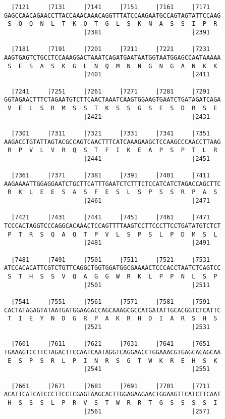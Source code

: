 \documentclass{article}
\begin{document}
\begin{Verbatim}
  |7121     |7131     |7141     |7151     |7161     |7171   
GAGCCAACAGAACCTTACCAAACAAACAGGTTTATCCAAGAATGCCAGTAGTATTCCAAG
 S  Q  Q  N  L  T  K  Q  T  G  L  S  K  N  A  S  S  I  P  R 
                      |2381                         |2391   
  
  |7181     |7191     |7201     |7211     |7221     |7231   
AAGTGAGTCTGCCTCCAAAGGACTAAATCAGATGAATAATGGTAATGGAGCCAATAAAAA
 S  E  S  A  S  K  G  L  N  Q  M  N  N  G  N  G  A  N  K  K 
                      |2401                         |2411   
  
  |7241     |7251     |7261     |7271     |7281     |7291   
GGTAGAACTTTCTAGAATGTCTTCAACTAAATCAAGTGGAAGTGAATCTGATAGATCAGA
 V  E  L  S  R  M  S  S  T  K  S  S  G  S  E  S  D  R  S  E 
                      |2421                         |2431   
  
  |7301     |7311     |7321     |7331     |7341     |7351   
AAGACCTGTATTAGTACGCCAGTCAACTTTCATCAAAGAAGCTCCAAGCCCAACCTTAAG
 R  P  V  L  V  R  Q  S  T  F  I  K  E  A  P  S  P  T  L  R 
                      |2441                         |2451   
  
  |7361     |7371     |7381     |7391     |7401     |7411   
AAGAAAATTGGAGGAATCTGCTTCATTTGAATCTCTTTCTCCATCATCTAGACCAGCTTC
 R  K  L  E  E  S  A  S  F  E  S  L  S  P  S  S  R  P  A  S 
                      |2461                         |2471   
  
  |7421     |7431     |7441     |7451     |7461     |7471   
TCCCACTAGGTCCCAGGCACAAACTCCAGTTTTAAGTCCTTCCCTTCCTGATATGTCTCT
 P  T  R  S  Q  A  Q  T  P  V  L  S  P  S  L  P  D  M  S  L 
                      |2481                         |2491   
  
  |7481     |7491     |7501     |7511     |7521     |7531   
ATCCACACATTCGTCTGTTCAGGCTGGTGGATGGCGAAAACTCCCACCTAATCTCAGTCC
 S  T  H  S  S  V  Q  A  G  G  W  R  K  L  P  P  N  L  S  P 
                      |2501                         |2511   
  
  |7541     |7551     |7561     |7571     |7581     |7591   
CACTATAGAGTATAATGATGGAAGACCAGCAAAGCGCCATGATATTGCACGGTCTCATTC
 T  I  E  Y  N  D  G  R  P  A  K  R  H  D  I  A  R  S  H  S 
                      |2521                         |2531   
  
  |7601     |7611     |7621     |7631     |7641     |7651   
TGAAAGTCCTTCTAGACTTCCAATCAATAGGTCAGGAACCTGGAAACGTGAGCACAGCAA
 E  S  P  S  R  L  P  I  N  R  S  G  T  W  K  R  E  H  S  K 
                      |2541                         |2551   
  
  |7661     |7671     |7681     |7691     |7701     |7711   
ACATTCATCATCCCTTCCTCGAGTAAGCACTTGGAGAAGAACTGGAAGTTCATCTTCAAT
 H  S  S  S  L  P  R  V  S  T  W  R  R  T  G  S  S  S  S  I 
                      |2561                         |2571   
  

\end{Verbatim}
\end{document}

